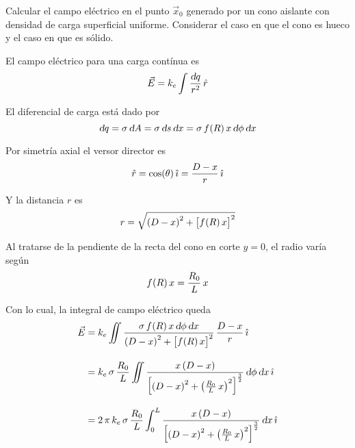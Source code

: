 \begin{mdframed}[style=ExampleFrame]
    \begin{example}
    \end{example}
    \begin{formatI}
        Calcular el campo eléctrico en el punto $\vec{x}_0$ generado por un cono aislante con densidad de carga superficial uniforme.
        Considerar el caso en que el cono es hueco y el caso en que es sólido.
    \end{formatI}

    \begin{center}
        \def\svgwidth{\linewidth}
        
    \end{center}

    El campo eléctrico para una carga contínua es
    \begin{equation*}
        \vec{E} = k_e \int \frac{\textsl{d} q}{r^2} \, \hat{r}
    \end{equation*}


    El diferencial de carga está dado por
    \begin{equation*}
        \textsl{d} q = \sigma \, \textsl{d} A
        = \sigma \, \textsl{d} s \, \textsl{d} x
        = \sigma \, f \hspace{-0.5mm} \left( R \right){x} \, \textsl{d} \phi \, \textsl{d} x
    \end{equation*}

    Por simetría axial el versor director es
    \begin{equation*}
        \hat{r} = \cos(\theta) \, \hat{\imath}
        = \frac{D-x}{r} \, \hat{\imath}
    \end{equation*}

    Y la distancia $r$ es
    \begin{equation*}
        r = \sqrt{\left(D-x\right)^2 + { \begin{bmatrix} f \hspace{-0.5mm} \left( R \right){x} \end{bmatrix} }^2}
    \end{equation*}

    Al tratarse de la pendiente de la recta del cono en corte $y=0$, el radio varía según
    \begin{equation*}
        f \hspace{-0.5mm} \left( R \right){x} = \frac{R_0}{L} \, x
    \end{equation*}

    Con lo cual, la integral de campo eléctrico queda
    \begin{align*}
        \vec{E} &= k_e \iint \frac{\sigma \, f \hspace{-0.5mm} \left( R \right){x} \, \textsl{d} \phi \, \textsl{d} x}{\left(D-x\right)^2 + { \begin{bmatrix} f \hspace{-0.5mm} \left( R \right){x} \end{bmatrix} }^2} \, \frac{D-x}{r} \, \hat{\imath}
        \\[1em]
        &= k_e \, \sigma \, \frac{R_0}{L} \iint \frac{x \left(D-x\right)}{{ \begin{bmatrix} \left(D-x\right)^2 + \left(\frac{R_0}{L} \, x\right)^2 \end{bmatrix} }^{\frac{3}{2}}} \, \textsl{d} \phi \, \textsl{d} x \, \hat{\imath}
        \\[1em]
        &= 2 \, \pi \, k_e \, \sigma \, \frac{R_0}{L} \int_0^L \frac{x \left(D-x\right)}{{ \begin{bmatrix} \left(D-x\right)^2 + \left(\frac{R_0}{L} \, x\right)^2 \end{bmatrix} }^{\frac{3}{2}}} \, \textsl{d} x \, \hat{\imath}
    \end{align*}


\end{mdframed}
